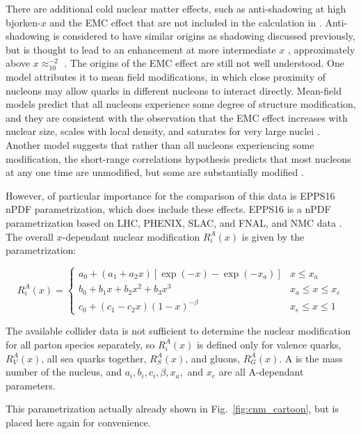   There are additional cold nuclear matter effects, such as anti-shadowing at high bjorken-$x$ and the EMC effect that are not included in the calculation in \cite{Kang2012}. Anti-shadowing is considered to have similar origins as shadowing discussed previously, but is thought to lead to an enhancement at more intermediate $x$ \cite{Brodsky1990a}, approximately above $x\approx_10^{-2}$ \cite{epps16:2017}. The origins of the EMC effect are still not well understood. One model attributes it to mean field modifications, in which close proximity of nucleons may allow quarks in different nucleons to interact directly. Mean-field models predict that all nucleons experience some degree of structure modification, and they are consistent with the observation that the EMC effect increases with nuclear size, scales with local density, and saturates for very large nuclei \cite{Hen2017a}. Another model suggests that rather than all nucleons experiencing some modification, the short-range correlations hypothesis predicts that most nucleons at any one time are unmodified, but some are substantially modified \cite{Norton2003a}.

However, of particular importance for the comparison of this data is EPPS16 nPDF parametrization, which does include these effects. EPPS16 is a nPDF parametrization based on LHC, PHENIX, SLAC, and FNAL, and NMC data \cite{epps16:2017}. The overall $x$-dependant nuclear modification $R_{i}^{A}(x)$ is given by the parametrization:

\begin{equation}
  R_{i}^{A}(x)=\left\{\begin{array}{ll}
      a_{0}+\left(a_{1}+a_{2} x\right)\left[\exp (-x)-\exp \left(-x_{a}\right)\right] & x \leq x_{a} \\
      b_{0}+b_{1} x+b_{2} x^{2}+b_{3} x^{3} & x_{a} \leq x \leq x_{e} \\
      c_{0}+\left(c_{1}-c_{2} x\right)(1-x)^{-\beta} & x_{e} \leq x \leq 1
  \end{array}\right.
\end{equation}

The available collider data is not sufficient to determine the nuclear modification for all parton species separately, so $R_{i}^{A}(x)$ is defined only for valence quarks,  $R_{V}^{A}(x)$, all sea quarks together,  $R_{S}^{A}(x)$, and gluons,  $R_{G}^{A}(x)$. A is the mass number of the nucleus, and  $a_i, b_i, c_i, \beta, x_a,$ and $x_e$ are all A-dependant parameters. 

This parametrization actually already shown in Fig.~\ref{fig:cnm_cartoon}, but is placed here again for convenience.

